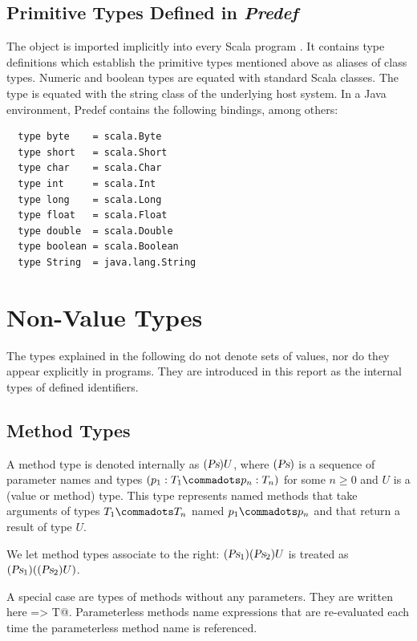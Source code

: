\subsection{Primitive Types Defined in {\em Predef}}

The object \lstinline@Predef@ is imported implicitly into every Scala
program . It contains type definitions which establish the primitive
types mentioned above as aliases of class types. Numeric and boolean
types are equated with standard Scala classes. The \lstinline@String@
type is equated with the string class of the underlying host
system. In a Java environment, Predef contains the following bindings,
among others:
\begin{lstlisting}
  type byte    = scala.Byte
  type short   = scala.Short
  type char    = scala.Char
  type int     = scala.Int
  type long    = scala.Long
  type float   = scala.Float
  type double  = scala.Double
  type boolean = scala.Boolean
  type String  = java.lang.String
\end{lstlisting}


\section{Non-Value Types}
\label{sec:synthetic-types}

The types explained in the following do not denote sets of values, nor
do they appear explicitly in programs. They are introduced in this
report as the internal types of defined identifiers.

\subsection{Method Types}
\label{sec:method-types}

A method type is denoted internally as $(\mbox{\sl Ps})U$, where $(\mbox{\sl Ps})$ is a
sequence of parameter names and types $(p_1:T_1 \commadots p_n:T_n)$
for some $n \geq 0$ and $U$ is a (value or method) type.  This type
represents named methods that take arguments of types $T_1 \commadots T_n$
named $p_1 \commadots p_n$ and that return a result of type $U$.

We let method types associate to the right: $(\mbox{\sl Ps}_1)(\mbox{\sl Ps}_2)U$ is
treated as $(\mbox{\sl Ps}_1)((\mbox{\sl Ps}_2)U)$.

A special case are types of methods without any parameters. They are
written here \lstinline@=> T@. Parameterless methods name expressions
that are re-evaluated each time the parameterless method name is
referenced.

